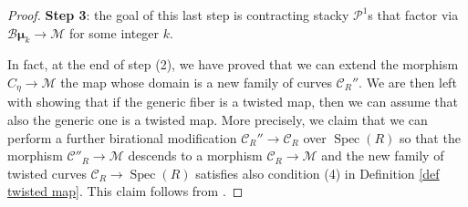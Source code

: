 \documentclass{amsart}
\newcommand{\bG}{\mathbb{G}}
\newcommand{\cB}{\mathcal{B}}
\newcommand{\cC}{\mathcal{C}}
\newcommand{\cM}{\mathcal{M}}
\newcommand{\cN}{\mathcal{N}}
\newcommand{\cP}{\mathcal{P}}
\newcommand{\spec}{\operatorname{Spec}}
\newcommand{\Gm}{\bG_{{\rm m}}}
\newcommand{\bmu}{\bm{\mu}}
\theoremstyle{definition}
\begin{document}
\begin{proof}

\textbf{Step 3}: the goal of this last step is contracting stacky $\cP^1$s that factor via $\cB\bmu_k\to \cM$ for some integer $k$.

In fact, at the end of step (2), we have proved that we can extend the morphism $C_\eta \to \cM$ the map whose domain is a new family of curves $\cC_R''$. We are then left with showing that if the generic fiber is a twisted map, then we can assume that also the generic one is a twisted map. More precisely, we claim that we can perform a further birational modification $\cC_R''\to \cC_R$ over $\spec(R)$ so that the morphism $\cC''_R \to \cM$ descends to a morphism $\cC_R\to \cM$ and the new family of twisted curves $\cC_R\to \spec(R) $ satisfies also condition (4) in Definition \ref{def twisted map}. This claim follows from .
\end{proof}
\end{document}
